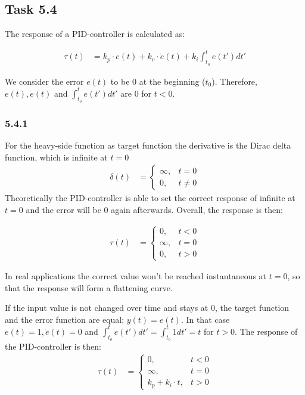 \subsection*{Task 5.4}

The response of a PID-controller is calculated as:

\begin{align*}
	\tau(t) &= k_p \cdot e(t) + k_v \cdot \dot{e}(t) + k_i \int_{t_o}^{t}e(t')dt'
\end{align*}

We consider the error $e(t)$ to be $0$ at the beginning ($t_0$).
Therefore, $e(t), \dot{e}(t)$ and $\int_{t_o}^{t}e(t')dt'$ are $0$ for $t < 0$.

\subsubsection*{5.4.1}

For the heavy-side function as target function the derivative is the Dirac delta function, which is infinite at $t=0$
\begin{align*}
	\delta(t) &= 
	\begin{cases}
		\infty, & t = 0\\
		0, & t \ne 0 
	\end{cases}
\end{align*}
Theoretically the PID-controller is able to set the correct response of infinite at $t=0$ and the error will be $0$ again afterwards.
Overall, the response is then:

\begin{align*}
\tau(t) &= 
\begin{cases}
0, & t < 0\\
\infty, & t = 0\\
0, & t > 0
\end{cases}
\end{align*}

In real applications the correct value won't be reached instantaneous at $t=0$, so that the response will form a flattening curve.\medskip

If the input value is not changed over time and stays at $0$, the target function and the error function are equal: $y(t) = e(t)$.
In that case $e(t) = 1, \dot{e}(t) = 0$ and $\int_{t_o}^{t}e(t')dt' = \int_{t_o}^{t} 1 dt' = t$ for $t > 0$.
The response of the PID-controller is then:
\begin{align*}
\tau(t) &= 
\begin{cases}
0, & t < 0\\
\infty, & t = 0\\
k_p + k_i \cdot t, & t > 0 
\end{cases}
\end{align*}

